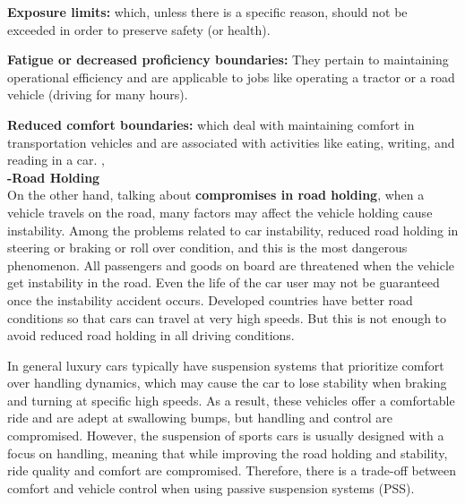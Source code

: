 \textbf{Exposure limits:} which, unless there is a specific reason, should not be exceeded in order to preserve safety (or health).

\textbf{Fatigue or decreased proficiency boundaries:} They pertain to maintaining operational efficiency and are applicable to jobs like operating a tractor or a road vehicle (driving for many hours).

\textbf{Reduced comfort boundaries:} which deal with maintaining comfort in transportation vehicles and are associated with activities like eating, writing, and reading in a car. \cite{east2021experimental}, \cite{oborne1983whole}\\
\textbf{-Road Holding}\\
On the other hand, talking about \textbf{compromises in road holding}, when a vehicle travels on the road, many factors may affect the vehicle holding cause instability. Among the problems related to car instability, reduced road holding in steering or braking or roll over condition, and this is the most dangerous phenomenon. All passengers and goods on board are threatened when the vehicle get instability in the road. Even the life of the car user may not be guaranteed once the instability accident occurs. Developed countries have better road conditions so that cars can travel at very high speeds. But this is not enough to avoid reduced road holding in all driving conditions. \cite{nguyen2023establishing}

In general luxury cars typically have suspension systems that prioritize comfort over handling dynamics, which may cause the car to lose stability when braking and turning at specific high speeds. As a result, these vehicles offer a comfortable ride and are adept at swallowing bumps, but handling and control are compromised. However, the suspension of sports cars is usually designed with a focus on handling, meaning that while improving the road holding and stability, ride quality and comfort are compromised. Therefore, there is a trade-off between comfort and vehicle control when using passive suspension systems (PSS). \cite{kuber2014modelling}
